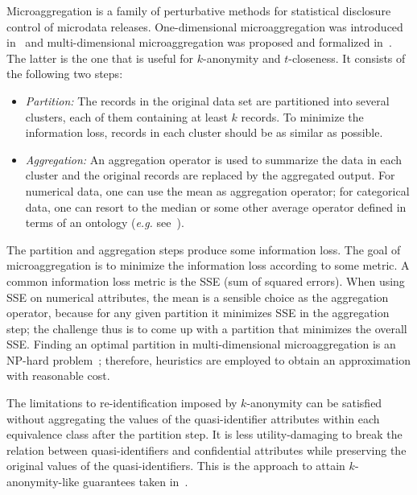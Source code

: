 \documentclass[10pt,journal,compsoc]{IEEEtran}
\theoremstyle{definition}
\theoremstyle{plain}
\begin{document}
Microaggregation is a family of perturbative methods
for statistical disclosure control of microdata releases. 
One-dimensional microaggregation was
introduced in~\cite{Defays1992Aggregates} 
and multi-dimensional microaggregation was proposed
and formalized in~\cite{Domingo02}.
The latter is the one that is useful
for $k$-anonymity and $t$-closeness.
It consists
of the following two steps:
\begin{itemize}
	\item {\em Partition:} The records in the original data set are partitioned
	into several clusters, each of them containing at least $k$ records.
	To minimize the information loss, records in each cluster should be
	as similar as possible.
	\item {\em Aggregation:} An aggregation operator is used to summarize the
	data in each cluster 
	and the original records are replaced by the aggregated output.
 	For numerical data, one can use the mean as aggregation operator;
for categorical data, one can resort to the median or some 
	other average operator defined in terms of an ontology ({\em e.g.} 
see~\cite{Domingo13}).
\end{itemize}
The partition and aggregation steps produce some information loss.
The goal of microaggregation is to minimize the information loss according
to some metric. A common information loss metric is the SSE (sum of
squared errors). 
When using SSE on 
numerical attributes, the mean is a sensible choice
as the aggregation operator, because for any given partition 
it minimizes SSE in the aggregation step;
the challenge thus is to come up with a partition that minimizes the
overall SSE.
Finding an optimal partition in multi-dimensional
microaggregation is an NP-hard problem~\cite{Oganian01Complexity};
therefore, heuristics are employed to obtain an approximation with
reasonable cost.



The limitations to re-identification imposed by $k$-anonymity can
be satisfied without aggregating the values of the quasi-identifier
attributes within each equivalence class after the partition step. 
It is less utility-damaging to break the relation 
between quasi-identifiers and confidential attributes 
while preserving the original values of the quasi-identifiers.
This is the approach to attain $k$-anonymity-like guarantees 
taken in~\cite{Xiao2006Anatomy,Soria2012Probabilistic}.
\end{document}
